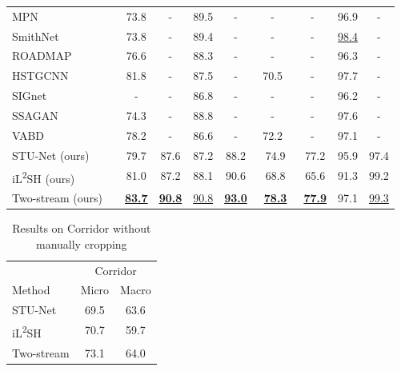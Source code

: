 \documentclass[lettersize,journal]{IEEEtran}
\begin{document}
\begin{table*}[!t]
\begin{tabular}{@{}lccccccccc@{}}
		MPN\cite{LearningNormal2021lva}						&    	& 73.8            	& -              	& 89.5		& -				& -				& -            	& 96.9		& -          \\
		SmithNet\cite{SmithNetStrictness2021nguyen}			&    	& 73.8            	& -              	& 89.4		& -				& -				& -            	& \underline{98.4}& -          \\
		ROADMAP\cite{RobustUnsupervised2021wanga}			&    	& 76.6            	& -              	& 88.3		& -				& -				& -            	& 96.3		& -          \\
		HSTGCNN\cite{HierarchicalSpatioTemporal2021zeng}	& \cmk 	& 81.8       		& -           		& 87.5		& -				& 70.5			& -		      	& 97.7		& -		    \\
		SIGnet\cite{AnomalyDetection2022fang}				&    	& -	            	& -              	& 86.8		& -				& -				& -            	& 96.2		& -          \\
		SSAGAN\cite{SelfSupervisedAttentive2022huang}		&    	& 74.3            	& -              	& 88.8		& -				& -				& -            	& 97.6		& -          \\
		VABD\cite{VariationalAbnormal2022li}				&    	& 78.2            	& -              	& 86.6		& -				& 72.2			& -            	& 97.1		& -          \\ \midrule
		STU-Net (ours)										&       & 79.7				& 87.6          	& 87.2      & 88.2          &~74.9\ts{\tddr}&~77.2\ts{\tddr}& 95.9     	& 97.4      \\
		iL\textsuperscript{2}SH (ours)						&       & 81.0          	& 87.2          	& 88.1      & 90.6         	&~68.8\ts{\tddr}&~65.6\ts{\tddr}& 91.3     	& 99.2      \\
		Two-stream (ours)									&       & \textbf{\underline{83.7}} 	& \textbf{\underline{90.8}} 	& \underline{90.8}      & \textbf{\underline{93.0}} & ~\textbf{\underline{78.3}}\ts{\tddr} & ~\textbf{\underline{77.9}}\ts{\tddr}	& 97.1    	& \underline{99.3}      \\ \bottomrule
	\end{tabular}
\end{table*}

\begin{table}[!t]
	\centering
	\caption{Results on Corridor without manually cropping}
	\label{tab:cor480}
	\begin{tabular}{@{}lcc@{}}
		\toprule
		& \multicolumn{2}{c}{Corridor} \\ \cmidrule(l){2-3} 
		Method     					& Micro         & Macro        \\ \midrule
		STU-Net    					& 69.5         	& 63.6        \\
		iL\textsuperscript{2}SH		& 70.7        	& 59.7        \\
		Two-stream 					& 73.1        	& 64.0        \\ \bottomrule
	\end{tabular}
\end{table}
\end{document}
